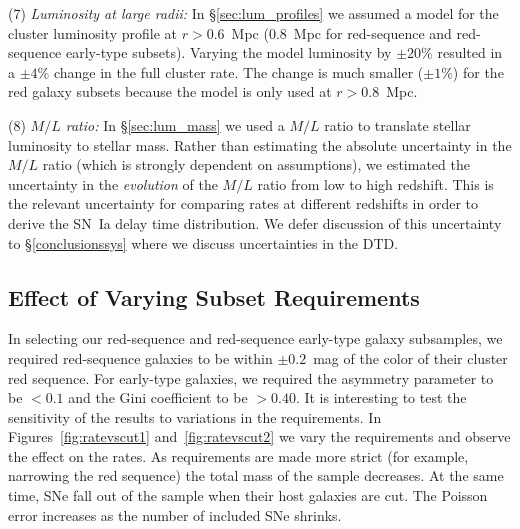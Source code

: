 (7) \emph{Luminosity at large radii:} In \S\ref{sec:lum_profiles} we assumed
a model for the cluster luminosity profile at $r>0.6$~Mpc (0.8~Mpc for
red-sequence and red-sequence early-type subsets). Varying the model
luminosity by $\pm 20\%$ resulted in a $\pm 4\%$ change in the full
cluster rate. The change is much smaller ($\pm 1\%$) for the red
galaxy subsets because the model is only used at $r>0.8$~Mpc.

(8) \emph{$M/L$ ratio:} In \S\ref{sec:lum_mass} we used a $M/L$ ratio to
translate stellar luminosity to stellar mass. Rather than estimating
the absolute uncertainty in the $M/L$ ratio (which is strongly
dependent on assumptions), we estimated the uncertainty in
the \emph{evolution} of the $M/L$ ratio from low to high
redshift. This is the relevant uncertainty for comparing rates at
different redshifts in order to derive the SN~Ia delay time
distribution. We defer discussion of this uncertainty
to \S\ref{conclusionssys} where we discuss uncertainties in the DTD.


\subsection{Effect of Varying Subset Requirements} \label{sec:ratevscut}

In selecting our red-sequence and red-sequence early-type galaxy
subsamples, we required red-sequence galaxies to be within $\pm
0.2$~mag of the color of their cluster red sequence. For early-type
galaxies, we required the asymmetry parameter to be $< 0.1$ and the
Gini coefficient to be $> 0.40$. It is interesting to test the
sensitivity of the results to variations in the requirements. In
Figures~\ref{fig:ratevscut1} and~\ref{fig:ratevscut2} we vary the
requirements and observe the effect on the rates. As requirements are
made more strict (for example, narrowing the red sequence) the total
mass of the sample decreases. At the same time, SNe fall out of the
sample when their host galaxies are cut. The Poisson error increases
as the number of included SNe shrinks.


